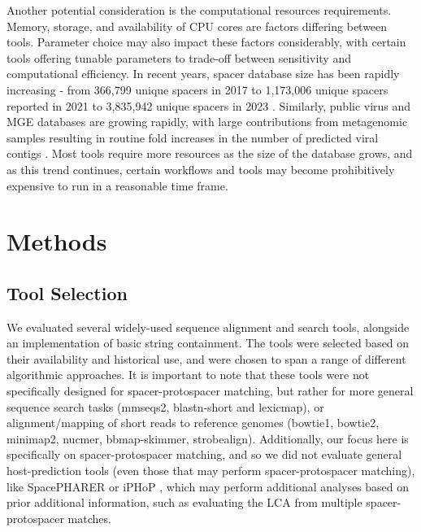 \documentclass[
]{article}
\begin{document}
Another potential consideration is the computational resources
requirements. Memory, storage, and availability of CPU cores are factors
differing between tools. Parameter choice may also impact these factors
considerably, with certain tools offering tunable parameters to
trade-off between sensitivity and computational efficiency. In recent
years, spacer database size has been rapidly increasing - from 366,799
unique spacers in 2017 \autocite{Shmakov_2017} to 1,173,006 unique
spacers reported in 2021 \autocite{Dion_2021} to 3,835,942 unique
spacers in 2023 \autocite{camargo_img_vr4_2023}. Similarly, public virus
and MGE databases are growing rapidly, with large contributions from
metagenomic samples resulting in routine fold increases in the number of
predicted viral contigs \autocite{camargo_img_vr4_2023}. Most tools
require more resources as the size of the database grows, and as this
trend continues, certain workflows and tools may become prohibitively
expensive to run in a reasonable time frame.

\section{Methods}\label{sec-methods}

\subsection{Tool Selection}\label{sec-tool-selection}

We evaluated several widely-used sequence alignment and search tools,
alongside an implementation of basic string containment. The tools were
selected based on their availability and historical use, and were chosen
to span a range of different algorithmic approaches. It is important to
note that these tools were not specifically designed for
spacer-protospacer matching, but rather for more general sequence search
tasks (mmseqs2, blastn-short and lexicmap), or alignment/mapping of
short reads to reference genomes (bowtie1, bowtie2, minimap2, nucmer,
bbmap-skimmer, strobealign). Additionally, our focus here is
specifically on spacer-protospacer matching, and so we did not evaluate
general host-prediction tools (even those that may perform
spacer-protospacer matching), like SpacePHARER \autocite{Zhang_2021} or
iPHoP \autocite{Roux2023_iphop}, which may perform additional analyses
based on prior additional information, such as evaluating the LCA from
multiple spacer-protospacer matches.
\end{document}
